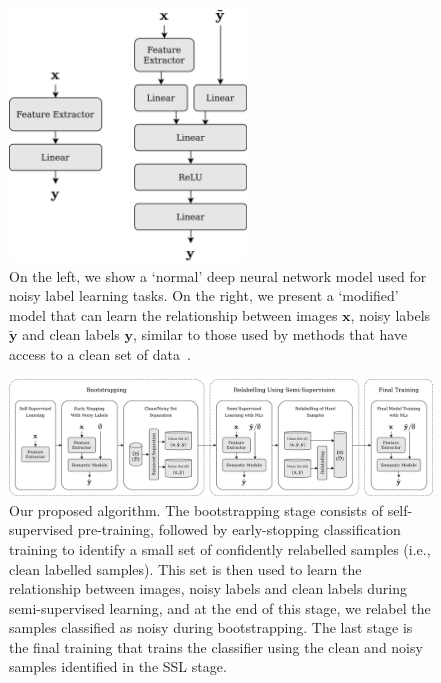 \documentclass[10pt,twocolumn,letterpaper]{article}
\begin{document}
\begin{figure}[t!]
    \begin{center}
    \includegraphics[width = 6.3cm]{Figures/Models2.drawio.png}
    \end{center}
    \caption{\small On the left, we show a `normal' deep neural network model used for noisy label learning tasks. On the right, we present a `modified' model that can learn the relationship between images $\mathbf{x}$, noisy labels $\tilde{\mathbf{y}}$ and clean labels $\mathbf{y}$, similar to those used by methods that have access to a clean set of data~\cite{inoue2017multi,veit2017learning,gu2021instancedependent}.}
    \label{fig:models}
\end{figure}

\begin{figure}[t!]
    \begin{center}
    \includegraphics[width = 17.0cm]{Figures/NewPipeline4.drawio.png}
    \end{center}
    \caption{\small Our proposed algorithm. The bootstrapping stage consists of self-supervised pre-training, followed by early-stopping classification training to identify a small set of confidently relabelled samples (i.e., clean labelled samples).
    This set is then used to learn the relationship between images, noisy labels and clean labels during semi-supervised learning, and at the end of this stage, we relabel the samples classified as noisy during bootstrapping. The last stage is the final training that trains the classifier using the clean and noisy samples identified in the SSL stage.}
    \label{fig:methodology}
\end{figure}
\end{document}
